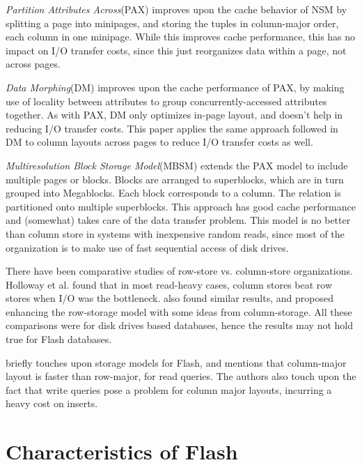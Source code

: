 \documentclass[twocolumn,11pt]{article}
\begin{document}
{\em Partition Attributes Across}(PAX) \cite{ADH01} improves upon the cache behavior of NSM
by splitting a page into minipages, and storing the tuples in column-major order, each
column in one minipage. While this improves cache performance, this has no impact on
I/O transfer costs, since this just reorganizes data within a page, not across pages.

{\em Data Morphing}(DM) \cite{HP 03} improves upon the cache performance of PAX, by
making use of locality between attributes to group concurrently-accessed attributes
together. As with PAX, DM only optimizes in-page layout, and doesn't help in reducing
I/O transfer costs. This paper applies the same approach followed in DM to column
layouts across pages to reduce I/O transfer costs as well.

{\em Multiresolution Block Storage Model}(MBSM) \cite{ZR 03} extends the PAX model
to include multiple pages or blocks. Blocks are arranged to superblocks, which are
in turn grouped into Megablocks. Each block corresponds to a column. The relation
is partitioned onto multiple superblocks. This approach has good cache performance
and (somewhat) takes care of the data transfer problem. This model is no better
than column store in systems with inexpensive random reads, since most of the
organization is to make use of fast sequential access of disk drives.

There have been comparative studies of row-store vs. column-store organizations. 
Holloway et al. \cite{HD 08} found that in most read-heavy cases, column stores
beat row stores when I/O was the bottleneck. \cite{HBN06} also found similar
results, and proposed enhancing the row-storage model with some ideas
from column-storage. All these comparisons were for disk drives based databases,
hence the results may not hold true for Flash databases.

\cite{SHW08} briefly touches upon storage models for Flash, and mentions that
column-major layout is faster than row-major, for read queries. The authors also
touch upon the fact that write queries pose a problem for column major layouts,
incurring a heavy cost on inserts.

\section{Characteristics of Flash}
\end{document}
